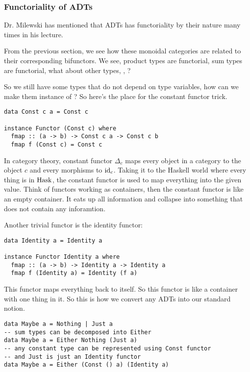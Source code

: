\subsubsection{Functoriality of ADTs}

Dr. Milewski has mentioned that ADTs has functoriality by their nature many
times in his lecture.

From the previous section, we see how these monoidal categories are related to
their corresponding bifunctors. We see, product types are functorial, sum
types are functorial, what about other types, , ?

So we still have some types that do not depend on type variables, how can we
make them instance of ? So here's the place for the constant
functor trick.

\begin{lstlisting}
data Const c a = Const c

instance Functor (Const c) where
  fmap :: (a -> b) -> Const c a -> Const c b
  fmap f (Const c) = Const c
\end{lstlisting}

In category theory, constant functor $\Delta_c$ maps every object in a category
to the object $c$ and every morphisms to $\mathrm{id}_c$. Taking it to the Haskell world
where every thing is in $\mathrm{Hask}$, the constant functor is used to map everything
into the given value. Think of functors working as containers, then the constant
functor is like an empty container. It eats up all information and collapse into
something that does not contain any inforamtion.

Another trivial functor is the identity functor:

\begin{lstlisting}
data Identity a = Identity a

instance Functor Identity a where
  fmap :: (a -> b) -> Identity a -> Identity a
  fmap f (Identity a) = Identity (f a)
\end{lstlisting}

This functor maps everything back to itself. So this functor is like a container
with one thing in it. So this is how we convert any ADTs into our standard
notion.

\begin{lstlisting}
data Maybe a = Nothing | Just a
-- sum types can be decomposed into Either
data Maybe a = Either Nothing (Just a)
-- any constant type can be represented using Const functor
-- and Just is just an Identity functor
data Maybe a = Either (Const () a) (Identity a)
\end{lstlisting}

